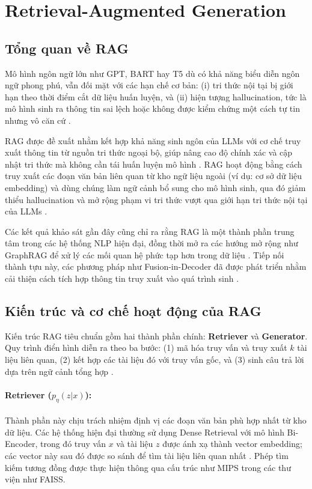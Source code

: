\section{Retrieval-Augmented Generation}

\subsection{Tổng quan về RAG}
Mô hình ngôn ngữ lớn như GPT, BART hay T5 dù có khả năng biểu diễn ngôn ngữ phong phú, vẫn đối mặt với các hạn chế cơ bản: (i) tri thức nội tại bị giới hạn theo thời điểm cắt dữ liệu huấn luyện, và (ii) hiện tượng hallucination, tức là mô hình sinh ra thông tin sai lệch hoặc không được kiểm chứng một cách tự tin nhưng vô căn cứ \cite{li2025knowledge, tonmoy2024comprehensive, knollmeyer2025document}.  

RAG được đề xuất nhằm kết hợp khả năng sinh ngôn của LLMs với cơ chế truy xuất thông tin từ nguồn tri thức ngoại bộ, giúp nâng cao độ chính xác và cập nhật tri thức mà không cần tái huấn luyện mô hình \cite{lewis2020rag, gao2023retrieval}. RAG hoạt động bằng cách truy xuất các đoạn văn bản liên quan từ kho ngữ liệu ngoài (ví dụ: cơ sở dữ liệu embedding) và dùng chúng làm ngữ cảnh bổ sung cho mô hình sinh, qua đó giảm thiểu hallucination và mở rộng phạm vi tri thức vượt qua giới hạn tri thức nội tại của LLMs \cite{gao2023retrieval, andriopoulos2023augmenting}.

Các kết quả khảo sát gần đây cũng chỉ ra rằng RAG là một thành phần trung tâm trong các hệ thống NLP hiện đại, đồng thời mở ra các hướng mở rộng như GraphRAG để xử lý các mối quan hệ phức tạp hơn trong dữ liệu \cite{knollmeyer2025document, peng2024graph}. Tiếp nối thành tựu này, các phương pháp như Fusion-in-Decoder đã được phát triển nhằm cải thiện cách tích hợp thông tin truy xuất vào quá trình sinh \cite{izacard2021leveraging}.

\subsection{Kiến trúc và cơ chế hoạt động của RAG}
\label{sec:rag_arch}
Kiến trúc RAG tiêu chuẩn gồm hai thành phần chính: \textbf{Retriever} và \textbf{Generator}. Quy trình điển hình diễn ra theo ba bước: (1) mã hóa truy vấn và truy xuất \(k\) tài liệu liên quan, (2) kết hợp các tài liệu đó với truy vấn gốc, và (3) sinh câu trả lời dựa trên ngữ cảnh tổng hợp \cite{lewis2020rag, gao2023retrieval}.

\paragraph{Retriever ($p_\eta(z|x)$):}  
Thành phần này chịu trách nhiệm định vị các đoạn văn bản phù hợp nhất từ kho dữ liệu. Các hệ thống hiện đại thường sử dụng Dense Retrieval với mô hình Bi-Encoder, trong đó truy vấn \(x\) và tài liệu \(z\) được ánh xạ thành vector embedding; các vector này sau đó được so sánh để tìm tài liệu liên quan nhất \cite{karpukhin2020dpr}. Phép tìm kiếm tương đồng được thực hiện thông qua cấu trúc như MIPS trong các thư viện như FAISS.

